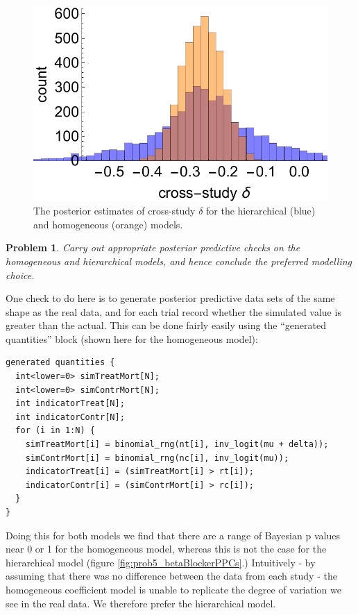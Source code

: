 \documentclass{article}
\newtheorem{problem}{Problem}[section]
\begin{document}
\begin{figure}[ht]
	\centerline{\includegraphics[width=1\textwidth]{figures/prob5_deltaComparison.pdf}}
	\caption{The posterior estimates of cross-study $\delta$ for the hierarchical (blue) and homogeneous (orange) models.}\label{fig:prob5_deltaComparison}
\end{figure}

\begin{problem}
	Carry out appropriate posterior predictive checks on the homogeneous and hierarchical models, and hence conclude the preferred modelling choice.
\end{problem}

One check to do here is to generate posterior predictive data sets of the same shape as the real data, and for each trial record whether the simulated value is greater than the actual. This can be done fairly easily using the ``generated quantities'' block (shown here for the homogeneous model):

\begin{verbatim}
generated quantities {
  int<lower=0> simTreatMort[N];
  int<lower=0> simContrMort[N];
  int indicatorTreat[N];
  int indicatorContr[N];
  for (i in 1:N) {
    simTreatMort[i] = binomial_rng(nt[i], inv_logit(mu + delta));
    simContrMort[i] = binomial_rng(nc[i], inv_logit(mu));
    indicatorTreat[i] = (simTreatMort[i] > rt[i]);
    indicatorContr[i] = (simContrMort[i] > rc[i]);
  }
}
\end{verbatim}

Doing this for both models we find that there are a range of Bayesian p values near 0 or 1 for the homogeneous model, whereas this is not the case for the hierarchical model (figure \ref{fig:prob5_betaBlockerPPCs}.) Intuitively - by assuming that there was no difference between the data from each study - the homogeneous coefficient model is unable to replicate the degree of variation we see in the real data. We therefore prefer the hierarchical model.
\end{document}
